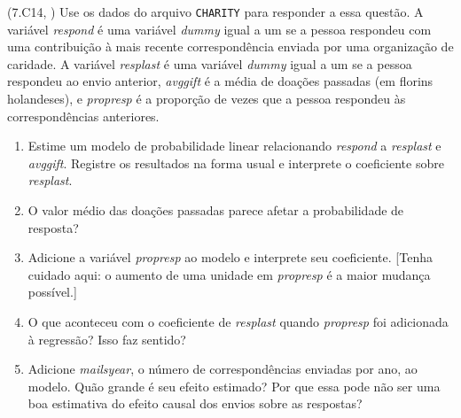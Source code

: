 \documentclass[12pt,letterpaper, onecolumn]{exam}
\begin{document}
\begin{questions}
\question\qstar (7.C14, \citep{wooldridge2016}) Use os dados do arquivo \texttt{CHARITY} para responder a essa questão. A variável \textit{respond} é uma variável \textit{dummy} igual a um se a pessoa respondeu com uma contribuição à mais recente correspondência enviada por uma organização de caridade. A variável \textit{resplast} é uma variável \textit{dummy} igual a um se a pessoa respondeu ao envio anterior, \textit{avggift} é a média de doações passadas (em florins holandeses), e \textit{propresp} é a proporção de vezes que a pessoa respondeu às correspondências anteriores.
\begin{enumerate}[label=(\roman*)]
    \item Estime um modelo de probabilidade linear relacionando \textit{respond} a \textit{resplast} e \textit{avggift}. Registre os resultados na forma usual e interprete o coeficiente sobre \textit{resplast}.
    \item O valor médio das doações passadas parece afetar a probabilidade de resposta?
    \item Adicione a variável \textit{propresp} ao modelo e interprete seu coeficiente. [Tenha cuidado aqui: o aumento de uma unidade em \textit{propresp} é a maior mudança possível.]
    \item O que aconteceu com o coeficiente de \textit{resplast} quando \textit{propresp} foi adicionada à regressão? Isso faz sentido?
    \item Adicione \textit{mailsyear}, o número de correspondências enviadas por ano, ao modelo. Quão grande é seu efeito estimado? Por que essa pode não ser uma boa estimativa do efeito causal dos envios sobre as respostas?
\end{enumerate}

\end{questions}
\newpage


\end{document}
